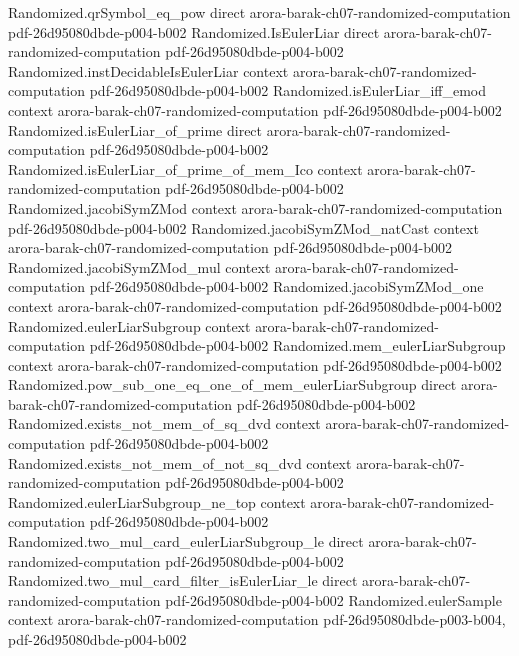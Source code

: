 \begin{theorem}
\proofstep
  {Randomized.qrSymbol_eq_pow}
  {direct}
  {arora-barak-ch07-randomized-computation}
  {pdf-26d95080dbde-p004-b002}
\proofstep
  {Randomized.IsEulerLiar}
  {direct}
  {arora-barak-ch07-randomized-computation}
  {pdf-26d95080dbde-p004-b002}
\proofstep
  {Randomized.instDecidableIsEulerLiar}
  {context}
  {arora-barak-ch07-randomized-computation}
  {pdf-26d95080dbde-p004-b002}
\proofstep
  {Randomized.isEulerLiar_iff_emod}
  {context}
  {arora-barak-ch07-randomized-computation}
  {pdf-26d95080dbde-p004-b002}
\proofstep
  {Randomized.isEulerLiar_of_prime}
  {direct}
  {arora-barak-ch07-randomized-computation}
  {pdf-26d95080dbde-p004-b002}
\proofstep
  {Randomized.isEulerLiar_of_prime_of_mem_Ico}
  {context}
  {arora-barak-ch07-randomized-computation}
  {pdf-26d95080dbde-p004-b002}
\proofstep
  {Randomized.jacobiSymZMod}
  {context}
  {arora-barak-ch07-randomized-computation}
  {pdf-26d95080dbde-p004-b002}
\proofstep
  {Randomized.jacobiSymZMod_natCast}
  {context}
  {arora-barak-ch07-randomized-computation}
  {pdf-26d95080dbde-p004-b002}
\proofstep
  {Randomized.jacobiSymZMod_mul}
  {context}
  {arora-barak-ch07-randomized-computation}
  {pdf-26d95080dbde-p004-b002}
\proofstep
  {Randomized.jacobiSymZMod_one}
  {context}
  {arora-barak-ch07-randomized-computation}
  {pdf-26d95080dbde-p004-b002}
\proofstep
  {Randomized.eulerLiarSubgroup}
  {context}
  {arora-barak-ch07-randomized-computation}
  {pdf-26d95080dbde-p004-b002}
\proofstep
  {Randomized.mem_eulerLiarSubgroup}
  {context}
  {arora-barak-ch07-randomized-computation}
  {pdf-26d95080dbde-p004-b002}
\proofstep
  {Randomized.pow_sub_one_eq_one_of_mem_eulerLiarSubgroup}
  {direct}
  {arora-barak-ch07-randomized-computation}
  {pdf-26d95080dbde-p004-b002}
\proofstep
  {Randomized.exists_not_mem_of_sq_dvd}
  {context}
  {arora-barak-ch07-randomized-computation}
  {pdf-26d95080dbde-p004-b002}
\proofstep
  {Randomized.exists_not_mem_of_not_sq_dvd}
  {context}
  {arora-barak-ch07-randomized-computation}
  {pdf-26d95080dbde-p004-b002}
\proofstep
  {Randomized.eulerLiarSubgroup_ne_top}
  {context}
  {arora-barak-ch07-randomized-computation}
  {pdf-26d95080dbde-p004-b002}
\proofstep
  {Randomized.two_mul_card_eulerLiarSubgroup_le}
  {direct}
  {arora-barak-ch07-randomized-computation}
  {pdf-26d95080dbde-p004-b002}
\proofstep
  {Randomized.two_mul_card_filter_isEulerLiar_le}
  {direct}
  {arora-barak-ch07-randomized-computation}
  {pdf-26d95080dbde-p004-b002}
\proofstep
  {Randomized.eulerSample}
  {context}
  {arora-barak-ch07-randomized-computation}
  {pdf-26d95080dbde-p003-b004,
    pdf-26d95080dbde-p004-b002}

\end{theorem}
